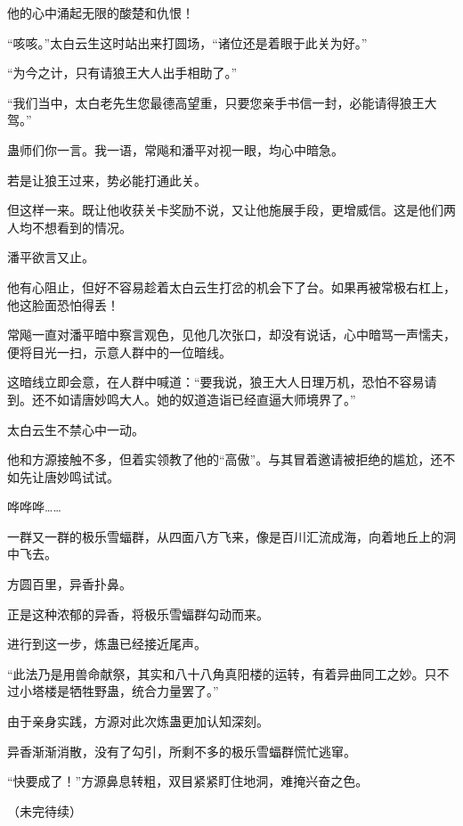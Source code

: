 \begin{this_body}
他的心中涌起无限的酸楚和仇恨！

“咳咳。”太白云生这时站出来打圆场，“诸位还是着眼于此关为好。”

“为今之计，只有请狼王大人出手相助了。”

“我们当中，太白老先生您最德高望重，只要您亲手书信一封，必能请得狼王大驾。”

蛊师们你一言。我一语，常飚和潘平对视一眼，均心中暗急。

若是让狼王过来，势必能打通此关。

但这样一来。既让他收获关卡奖励不说，又让他施展手段，更增威信。这是他们两人均不想看到的情况。

潘平欲言又止。

他有心阻止，但好不容易趁着太白云生打岔的机会下了台。如果再被常极右杠上，他这脸面恐怕得丢！

常飚一直对潘平暗中察言观色，见他几次张口，却没有说话，心中暗骂一声懦夫，便将目光一扫，示意人群中的一位暗线。

这暗线立即会意，在人群中喊道：“要我说，狼王大人日理万机，恐怕不容易请到。还不如请唐妙鸣大人。她的奴道造诣已经直逼大师境界了。”

太白云生不禁心中一动。

他和方源接触不多，但着实领教了他的“高傲”。与其冒着邀请被拒绝的尴尬，还不如先让唐妙鸣试试。

哗哗哗……

一群又一群的极乐雪蝠群，从四面八方飞来，像是百川汇流成海，向着地丘上的洞中飞去。

方圆百里，异香扑鼻。

正是这种浓郁的异香，将极乐雪蝠群勾动而来。

进行到这一步，炼蛊已经接近尾声。

“此法乃是用兽命献祭，其实和八十八角真阳楼的运转，有着异曲同工之妙。只不过小塔楼是牺牲野蛊，统合力量罢了。”

由于亲身实践，方源对此次炼蛊更加认知深刻。

异香渐渐消散，没有了勾引，所剩不多的极乐雪蝠群慌忙逃窜。

“快要成了！”方源鼻息转粗，双目紧紧盯住地洞，难掩兴奋之色。

（未完待续）

\end{this_body}


